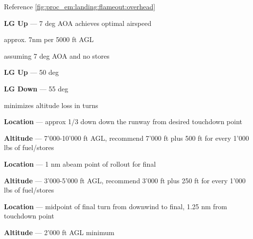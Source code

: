 \begin{tcoloritemize}
    Reference \cref{fig:proc_em:landing:flameout:overhead}

    \textbf{LG Up} --- 7 deg AOA achieves optimal airspeed

    \blueitem[Glideslope] 
    approx. 7nm per 5000 ft AGL 
    
    \medskip 
    assuming 7 deg AOA and no stores

    \textbf{LG Up} --- 50 deg

    \medskip
    \textbf{LG Down} --- 55 deg

    \bigskip
    minimizes altitude loss in turns

    \textbf{Location} --- approx {1/3 down down the runway} from desired touchdown point

    \bigskip
    \textbf{Altitude} --- {7'000-10'000 ft AGL},
    recommend 7'000 ft plus 500 ft for every 1'000 lbs of fuel/stores

    \textbf{Location} --- {1 nm abeam} point of rollout for final 

    \bigskip
    \textbf{Altitude} --- {3'000-5'000 ft AGL},
    recommend 3'000 ft plus 250 ft for every 1'000 lbs of fuel/stores

    \textbf{Location} --- midpoint of final turn from downwind to final,
    {1.25 nm from touchdown point}

    \bigskip
    \textbf{Altitude} --- {2'000 ft AGL minimum}
    
\end{tcoloritemize}

